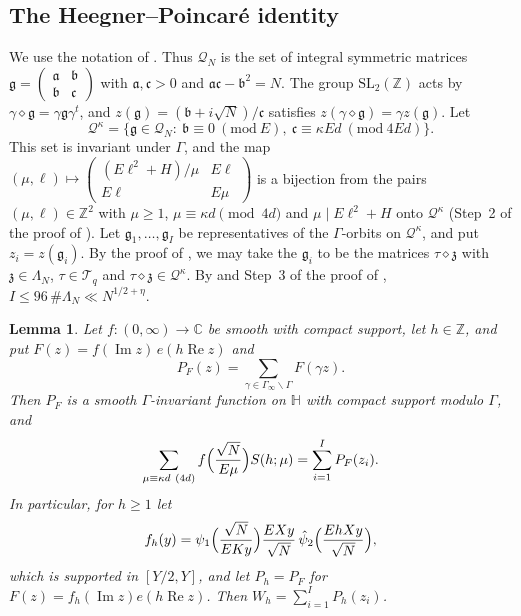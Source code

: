\documentclass[11pt]{amsart}
\newtheorem{lemma}[theorem]{Lemma}
\theoremstyle{remark}
\theoremstyle{definition}
\numberwithin{equation}{section}
\newcommand{\Qc}{\mathcal{Q}}
\newcommand{\Tc}{\mathcal{T}}
\newcommand{\Z}{\mathbb{Z}}
\newcommand{\C}{\mathbb{C}}
\newcommand{\Hb}{\mathbb{H}}
\newcommand{\ga}{\mathfrak{a}}
\newcommand{\gb}{\mathfrak{b}}
\newcommand{\gc}{\mathfrak{c}}
\newcommand{\fg}{\mathfrak{g}}
\newcommand{\gz}{\mathfrak{z}}
\newcommand{\SL}{\mathrm{SL}}
\begin{document}
\subsection{The Heegner--Poincar\'e identity}
We use the notation of \cite[\S6.2]{II}. Thus $\Qc_N$ is the set of integral symmetric matrices $\fg=\left(\begin{smallmatrix}\ga&\gb\\ \gb&\gc\end{smallmatrix}\right)$ with $\ga,\gc>0$ and $\ga\gc-\gb^2=N$. The group $\SL_2(\Z)$ acts by $\gamma\diamond\fg=\gamma\fg\gamma^t$, and $z(\fg)=(\gb+i\sqrt N)/\gc$ satisfies $z(\gamma\diamond\fg)=\gamma z(\fg)$. Let
\[
\Qc^\kappa=\{\fg\in\Qc_N:\ \gb\equiv0\ (\mathrm{mod}\ E),\ \gc\equiv\kappa Ed\ (\mathrm{mod}\ 4Ed)\}.
\]
This set is invariant under $\Gamma$, and the map $(\mu,\ell)\mapsto\left(\begin{smallmatrix}(E\ell^2+H)/\mu&E\ell\\E\ell&E\mu\end{smallmatrix}\right)$ is a bijection from the pairs $(\mu,\ell)\in\Z^2$ with $\mu\ge1$, $\mu\equiv\kappa d\pmod{4d}$ and $\mu\mid E\ell^2+H$ onto $\Qc^\kappa$ (Step~2 of the proof of \cite[Proposition~6.5]{II}). Let $\fg_1,\dots,\fg_I$ be representatives of the $\Gamma$-orbits on $\Qc^\kappa$, and put $z_i=z(\fg_i)$. By the proof of \cite[Lemma~6.2(b)]{II}, we may take the $\fg_i$ to be the matrices $\tau\diamond\gz$ with $\gz\in\Lambda_N$, $\tau\in\Tc_q$ and $\tau\diamond\gz\in\Qc^\kappa$. By \cite[(6.3)]{II} and Step~3 of the proof of \cite[Lemma~6.4]{II}, $I\le96\,\#\Lambda_N\ll N^{1/2+\eta}$.

\begin{lemma}\label{lem:HP}
Let $f:(0,\infty)\to\C$ be smooth with compact support, let $h\in\Z$, and put $F(z)=f(\operatorname{Im}z)\,e(h\operatorname{Re}z)$ and
\[
P_F(z)=\sum_{\gamma\in\Gamma_\infty\backslash\Gamma}F(\gamma z).
\]
Then $P_F$ is a smooth $\Gamma$-invariant function on $\Hb$ with compact support modulo $\Gamma$, and
\begin{equation}\label{eq:HP}
\sum_{\mu\equiv\kappa d\ (4d)}f\Bigl(\frac{\sqrt N}{E\mu}\Bigr)S(h;\mu)=\sum_{i=1}^IP_F(z_i).
\end{equation}
In particular, for $h\ge1$ let
\begin{equation}\label{eq:fh}
f_h(y)=\psi_1\Bigl(\frac{\sqrt N}{EKy}\Bigr)\frac{EXy}{\sqrt N}\,\hat\psi_2\Bigl(\frac{EhXy}{\sqrt N}\Bigr),
\end{equation}
which is supported in $[Y/2,Y]$, and let $P_h=P_F$ for $F(z)=f_h(\operatorname{Im}z)e(h\operatorname{Re}z)$. Then $W_h=\sum_{i=1}^IP_h(z_i)$.
\end{lemma}
\end{document}
